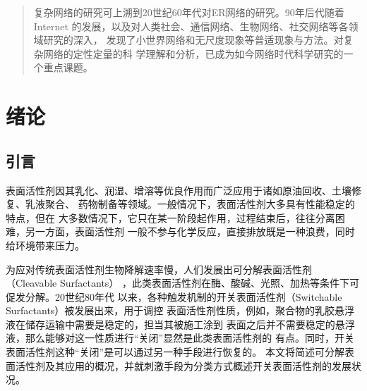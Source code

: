 \documentclass[bachelor,adobefonts]{jnuthesis} %
\author{陈育明}
\institute{江南大学}
\begin{document}
    \maketitle
    \frontmatter
    \begin{abstract}
        复杂网络的研究可上溯到20世纪60年代对ER网络的研究。90年后代随着Internet
        的发展，以及对人类社会、通信网络、生物网络、社交网络等各领域研究的深入，
        发现了小世界网络和无尺度现象等普适现象与方法。对复杂网络的定性定量的科
        学理解和分析，已成为如今网络时代科学研究的一个重点课题。
    \end{abstract}
    
    \begin{englishabstract}
        \blindtext
    \end{englishabstract}
    
    \tableofcontents
    
    \mainmatter
    
    \chapter{绪论}\label{chapter_introduction}
    \section{引言}
    表面活性剂因其乳化、润湿、增溶等优良作用而广泛应用于诸如原油回收、土壤修复、乳液聚合、
    药物制备等领域\cite{秦勇2009}。一般情况下，表面活性剂大多具有性能稳定的特点，但在
    大多数情况下，它只在某一阶段起作用，过程结束后，往往分离困难，另一方面，表面活性剂
    一般不参与化学反应，直接排放既是一种浪费，同时给环境带来压力\cite{秦勇2009}。
    
    为应对传统表面活性剂生物降解速率慢，人们发展出可分解表面活性剂（Cleavable Surfactants）
    ，此类表面活性剂在酶、酸碱、光照、加热等条件下可促发分解\cite{hellberg2000}。20世纪80年代
    以来，各种触发机制的开关表面活性剂（Switchable Surfactants）被发展出来，用于调控
    表面活性剂性质，例如，聚合物的乳胶悬浮液在储存运输中需要是稳定的，担当其被施工涂到
    表面之后并不需要稳定的悬浮液，那么能够对这一性质进行“关闭”显然是此类表面活性剂的
    有点\cite{jessop2012}。同时，开关表面活性剂这种“关闭”是可以通过另一种手段进行恢复的。
    本文将简述可分解表面活性剂及其应用的概况，并就刺激手段为分类方式概述开关表面活性剂的发展状况。
    
\end{document}
